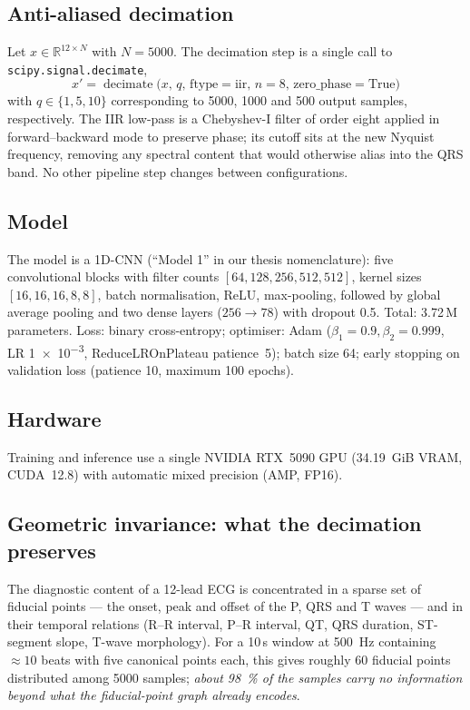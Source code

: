 \documentclass[conference]{IEEEtran}
\begin{document}
\subsection{Anti-aliased decimation}
Let $x\in\mathbb{R}^{12\times N}$ with $N=5000$. The decimation step is a
single call to \texttt{scipy.signal.decimate},
\begin{equation}
 x' = \operatorname{decimate}\bigl(x,\, q,\, \text{ftype}=\text{iir},\, n=8,\,
                                  \text{zero\_phase}=\text{True}\bigr)
\end{equation}
with $q\in\{1,5,10\}$ corresponding to \num{5000}, \num{1000} and
\num{500} output samples, respectively. The IIR low-pass is a
Chebyshev-I filter of order eight applied in forward--backward mode to
preserve phase; its cutoff sits at the new Nyquist frequency, removing any
spectral content that would otherwise alias into the QRS band. No other
pipeline step changes between configurations.

\subsection{Model}
The model is a 1D-CNN (``Model 1'' in our thesis nomenclature): five
convolutional blocks with filter counts $[64,128,256,512,512]$, kernel
sizes $[16,16,16,8,8]$, batch normalisation, ReLU, max-pooling, followed
by global average pooling and two dense layers ($256\rightarrow 78$) with
dropout \num{0.5}. Total: \num{3.72}\,M parameters. Loss: binary
cross-entropy; optimiser: Adam ($\beta_1=0.9, \beta_2=0.999$, LR
\num{1e-3}, ReduceLROnPlateau patience~5); batch size \num{64}; early
stopping on validation loss (patience \num{10}, maximum \num{100} epochs).

\subsection{Hardware}
Training and inference use a single NVIDIA RTX~5090 GPU (34.19~GiB VRAM,
CUDA~12.8) with automatic mixed precision (AMP, FP16).

\subsection{Geometric invariance: what the decimation preserves}
\label{sec:geometry}
The diagnostic content of a 12-lead ECG is concentrated in a sparse set of
fiducial points --- the onset, peak and offset of the P, QRS and T waves
--- and in their temporal relations (R--R interval, P--R interval, QT,
QRS duration, ST-segment slope, T-wave morphology). For a 10\,s window at
\SI{500}{\hertz} containing $\approx 10$ beats with five canonical points
each, this gives roughly \num{60} fiducial points distributed among
\num{5000} samples; \emph{about \SI{98}{\percent} of the samples carry
no information beyond what the fiducial-point graph already encodes}.
\end{document}
